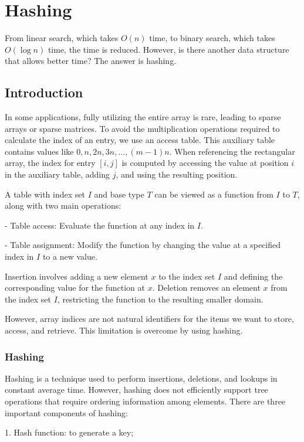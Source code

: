 \chapter{Hashing}

From linear search, which takes \(O(n)\) time, to binary search, which takes \(O(\log n)\) time, the time is reduced. However, is there another data structure that allows better time? The answer is hashing.

\section{Introduction}
In some applications, fully utilizing the entire array is rare, leading to sparse arrays or sparse matrices. To avoid the multiplication operations required to calculate the index of an entry, we use an access table. This auxiliary table contains values like \(0, n, 2n, 3n, \dots, (m-1)n\). When referencing the rectangular array, the index for entry \([i, j]\) is computed by accessing the value at position \(i\) in the auxiliary table, adding \(j\), and using the resulting position.

A table with index set \(I\) and base type \(T\) can be viewed as a function from \(I\) to \(T\), along with two main operations:

- Table access: Evaluate the function at any index in \(I\).

- Table assignment: Modify the function by changing the value at a specified index in \(I\) to a new value.

Insertion involves adding a new element \(x\) to the index set \(I\) and defining the corresponding value for the function at \(x\). Deletion removes an element \(x\) from the index set \(I\), restricting the function to the resulting smaller domain.

However, array indices are not natural identifiers for the items we want to store, access, and retrieve. This limitation is overcome by using hashing.

\subsection{Hashing}
Hashing is a technique used to perform insertions, deletions, and lookups in constant average time. However, hashing does not efficiently support tree operations that require ordering information among elements. There are three important components of hashing:

1. Hash function: to generate a key; 

